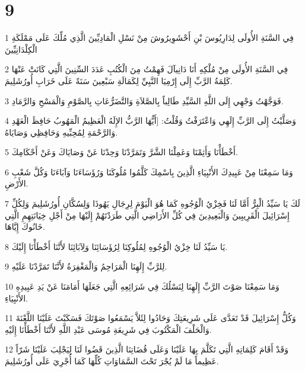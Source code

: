 \chapter{9}

\par 1 فِي السَّنَةِ الأُولَى لِدَارِيُوسَ بْنِ أَحْشَوِيرُوشَ مِنْ نَسْلِ الْمَادِيِّينَ الَّذِي مُلِّكَ عَلَى مَمْلَكَةِ الْكِلْدَانِيِّينَ
\par 2 فِي السَّنَةِ الأُولَى مِنْ مُلْكِهِ أَنَا دَانِيآلَ فَهِمْتُ مِنَ الْكُتُبِ عَدَدَ السِّنِينَ الَّتِي كَانَتْ عَنْهَا كَلِمَةُ الرَّبِّ إِلَى إِرْمِيَا النَّبِيِّ لِكَمَالَةِ سَبْعِينَ سَنَةً عَلَى خَرَابِ أُورُشَلِيمَ.
\par 3 فَوَجَّهْتُ وَجْهِي إِلَى اللَّهِ السَّيِّدِ طَالِباً بِالصَّلاَةِ وَالتَّضَرُّعَاتِ بِالصَّوْمِ وَالْمَسْحِ وَالرَّمَادِ.
\par 4 وَصَلَّيْتُ إِلَى الرَّبِّ إِلَهِي وَاعْتَرَفْتُ وَقُلْتُ: [أَيُّهَا الرَّبُّ الإِلَهُ الْعَظِيمُ الْمَهُوبُ حَافِظَ الْعَهْدِ وَالرَّحْمَةِ لِمُحِبِّيهِ وَحَافِظِي وَصَايَاهُ.
\par 5 أَخْطَأْنَا وَأَثِمْنَا وَعَمِلْنَا الشَّرَّ وَتَمَرَّدْنَا وَحِدْنَا عَنْ وَصَايَاكَ وَعَنْ أَحْكَامِكَ.
\par 6 وَمَا سَمِعْنَا مِنْ عَبِيدِكَ الأَنْبِيَاءِ الَّذِينَ بِاسْمِكَ كَلَّمُوا مُلُوكَنَا وَرُؤَسَاءَنَا وَآبَاءَنَا وَكُلَّ شَعْبِ الأَرْضِ.
\par 7 لَكَ يَا سَيِّدُ الْبِرُّ أَمَّا لَنَا فَخِزْيُ الْوُجُوهِ كَمَا هُوَ الْيَوْمَ لِرِجَالِ يَهُوذَا وَلِسُكَّانِ أُورُشَلِيمَ وَلِكُلِّ إِسْرَائِيلَ الْقَرِيبِينَ وَالْبَعِيدِينَ فِي كُلِّ الأَرَاضِي الَّتِي طَرَدْتَهُمْ إِلَيْهَا مِنْ أَجْلِ خِيَانَتِهِمِ الَّتِي خَانُوكَ إِيَّاهَا.
\par 8 يَا سَيِّدُ لَنَا خِزْيُ الْوُجُوهِ لِمُلُوكِنَا لِرُؤَسَائِنَا وَلِآبَائِنَا لأَنَّنَا أَخْطَأْنَا إِلَيْكَ.
\par 9 لِلرَّبِّ إِلَهِنَا الْمَرَاحِمُ وَالْمَغْفِرَةُ لأَنَّنَا تَمَرَّدْنَا عَلَيْهِ.
\par 10 وَمَا سَمِعْنَا صَوْتَ الرَّبِّ إِلَهِنَا لِنَسْلُكَ فِي شَرَائِعِهِ الَّتِي جَعَلَهَا أَمَامَنَا عَنْ يَدِ عَبِيدِهِ الأَنْبِيَاءِ.
\par 11 وَكُلُّ إِسْرَائِيلَ قَدْ تَعَدَّى عَلَى شَرِيعَتِكَ وَحَادُوا لِئَلاَّ يَسْمَعُوا صَوْتَكَ فَسَكَبْتَ عَلَيْنَا اللَّعْنَةَ وَالْحَلْفَ الْمَكْتُوبَ فِي شَرِيعَةِ مُوسَى عَبْدِ اللَّهِ لأَنَّنَا أَخْطَأْنَا إِلَيْهِ.
\par 12 وَقَدْ أَقَامَ كَلِمَاتِهِ الَّتِي تَكَلَّمَ بِهَا عَلَيْنَا وَعَلَى قُضَاتِنَا الَّذِينَ قَضُوا لَنَا لِيَجْلِبَ عَلَيْنَا شَرّاً عَظِيماً مَا لَمْ يُجْرَ تَحْتَ السَّمَاوَاتِ كُلِّهَا كَمَا أُجْرِيَ عَلَى أُورُشَلِيمَ.
